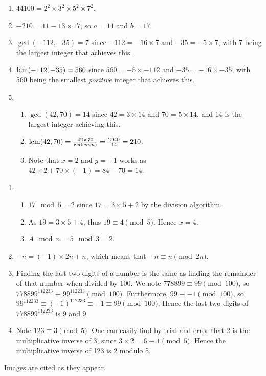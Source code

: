 \begin{enumerate}
    \item $44100 = 2^2 \times 3^2 \times 5^2 \times 7^2$.
    \item $-210 = 11 - 13 \times 17$, so $a = 11$ and $b = 17$.
    \item $\gcd(-112, -35) = 7$ since $-112 = -16 \times 7$ and $-35 = -5 \times 7$, with 7 being the largest integer that achieves this.
    \item $\mathrm{lcm}(-112, -35) = 560$ since $560 = -5 \times -112$ and $-35 = -16 \times -35$, with 560 being the smallest \textit{positive} integer that achieves this.
    \item \begin{enumerate}[label=(\roman*)]
        \item $\gcd(42, 70) = 14$ since $42 = 3 \times 14$ and $70 = 5 \times 14$, and 14 is the largest integer achieving this.
        \item $\mathrm{lcm}(42, 70) = \frac{42 \times 70}{\gcd(m, n)} = \frac{2940}{14} = 210$.
        \item Note that $x = 2$ and $y = -1$ works as $42 \times 2 + 70 \times (-1) = 84 - 70 = 14$.
    \end{enumerate}
\end{enumerate}

\begin{enumerate}
    \item \begin{enumerate}[label=(\alph*)]
        \item $17 \mod 5 = 2$ since $17 = 3 \times 5 + 2$ by the division algorithm.
        \item As $19 = 3 \times 5 + 4$, thus $19 \equiv 4 \pmod 5$. Hence $x = 4$.
        \item $A \mod n = 5 \mod 3 = 2$.
    \end{enumerate}
    \item $-n = (-1) \times 2n + n$, which means that $-n \equiv n \pmod{2n}$.
    \item Finding the last two digits of a number is the same as finding the remainder of that number when divided by 100. We note $778899 \equiv 99 \pmod{100}$, so $778899^{112233} \equiv 99^{112233} \pmod{100}$. Furthermore, $99 \equiv -1 \pmod{100}$, so $99^{112233}\equiv (-1)^{112233} \equiv -1 \equiv 99 \pmod{100}$. Hence the last two digits of $778899^{112233}$ is 9 and 9.
    \item Note $123 \equiv 3 \pmod 5$. One can easily find by trial and error that 2 is the multiplicative inverse of 3, since $3 \times 2 = 6 \equiv 1 \pmod 5$. Hence the multiplicative inverse of 123 is 2 modulo 5.
\end{enumerate}

Images are cited as they appear.

\printbibliography[heading=bibintoc, title={References and Bibliography}]


